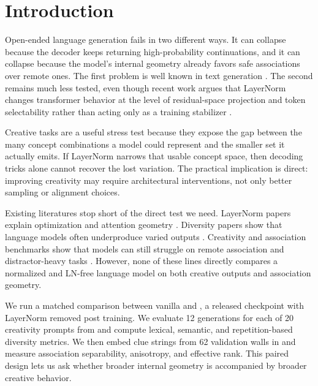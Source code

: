 \section{Introduction}
\label{sec:introduction}

Open-ended language generation fails in two different ways. It can collapse because the decoder keeps returning high-probability continuations, and it can collapse because the model's internal geometry already favors safe associations over remote ones. The first problem is well known in text generation \citep{holtzman2020curious}. The second remains much less tested, even though recent work argues that LayerNorm changes transformer behavior at the level of residual-space projection and token selectability rather than acting only as a training stabilizer \citep{xiong2020layernorm,brody2023expressivity}.

 Creative tasks are a useful stress test because they expose the gap between the many concept combinations a model could represent and the smaller set it actually emits. If LayerNorm narrows that usable concept space, then decoding tricks alone cannot recover the lost variation. The practical implication is direct: improving creativity may require architectural interventions, not only better sampling or alignment choices.

 Existing literatures stop short of the direct test we need. LayerNorm papers explain optimization and attention geometry \citep{xiong2020layernorm,brody2023expressivity,zhu2025transformers}. Diversity papers show that language models often underproduce varied outputs \citep{holtzman2020curious,zhang2025noveltybench}. Creativity and association benchmarks show that models can still struggle on remote association and distractor-heavy tasks \citep{chen2023creativity,naeini2023ocw}. However, none of these lines directly compares a normalized and LN-free language model on both creative outputs and association geometry.

 We run a matched comparison between vanilla \gpttwo and \lnfreegpt, a released checkpoint with LayerNorm removed post training. We evaluate 12 generations for each of 20 creativity prompts from \noveltybench and compute lexical, semantic, and repetition-based diversity metrics. We then embed clue strings from 62 validation walls in \ocw and measure association separability, anisotropy, and effective rank. This paired design lets us ask whether broader internal geometry is accompanied by broader creative behavior.

